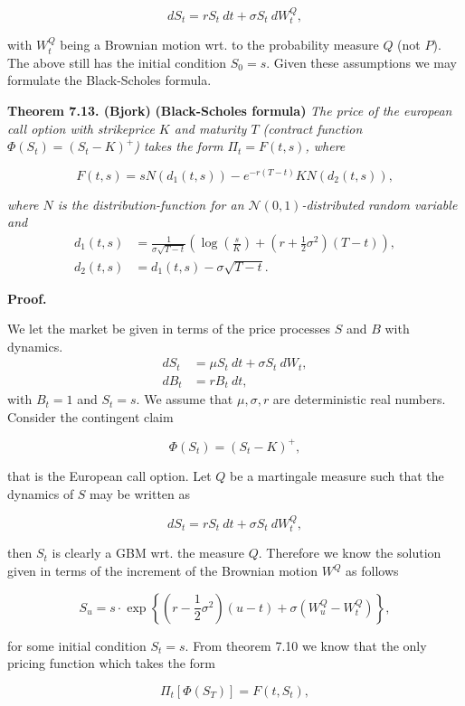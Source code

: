 \documentclass[a4paper,10pt,openany]{book}
\begin{document}
\[
dS_t=r S_t\ dt+\sigma S_t\ dW^Q_t,\tag{7.47}
\]

with \(W_t^Q\) being a Brownian motion wrt. to the probability measure \(Q\) (not \(P\)). The above still has the initial condition \(S_0=s\). Given these assumptions we may formulate the Black-Scholes formula.

\textbf{Theorem 7.13. (Bjork)} \textbf{(Black-Scholes formula)} \emph{The price of the european call option with strikeprice \(K\) and maturity \(T\) (contract function \(\Phi(S_t)=\left( S_t - K\right)^+\)) takes the form \(\Pi_t=F(t,s)\), where}

\[
F(t,s)=s N(d_1(t,s))-e^{-r(T-t)}KN(d_2(t,s)),\tag{7.52}
\]

\emph{where \(N\) is the distribution-function for an \(\mathcal{N}(0,1)\)-distributed random variable and}
\begin{align*}
d_1(t,s)&=\frac{1}{\sigma \sqrt{T-t}}\left(\log\left(\frac{s}{K}\right)+\left(r+\frac{1}{2}\sigma^2\right)(T-t)\right),\tag{7.53}\\
d_2(t,s)&=d_1(t,s)-\sigma\sqrt{T-t}.\tag{7.54}
\end{align*}

\textbf{Proof.}

We let the market be given in terms of the price processes \(S\) and \(B\) with dynamics.
\begin{align*}
dS_t&=\mu S_t\ dt+\sigma S_t\ dW_t,\\
dB_t&=r B_t\ dt,
\end{align*}
with \(B_t=1\) and \(S_t=s\). We assume that \(\mu,\sigma, r\) are deterministic real numbers. Consider the contingent claim

\[
\Phi(S_t)=\left( S_t - K\right)^+,
\]

that is the European call option. Let \(Q\) be a martingale measure such that the dynamics of \(S\) may be written as

\[
dS_t=r S_t\ dt+\sigma S_t\ dW^Q_t,
\]

then \(S_t\) is clearly a GBM wrt. the measure \(Q\). Therefore we know the solution given in terms of the increment of the Brownian motion \(W^Q\) as follows

\[
S_u=s\cdot \exp\left\{\left(r-\frac{1}{2}\sigma^2\right)(u-t)+\sigma\left(W_u^Q-W_t^Q\right)\right\},
\]

for some initial condition \(S_t=s\). From theorem 7.10 we know that the only pricing function which takes the form

\[
\Pi_t[\Phi(S_T)]=F(t,S_t),
\]
\end{document}
